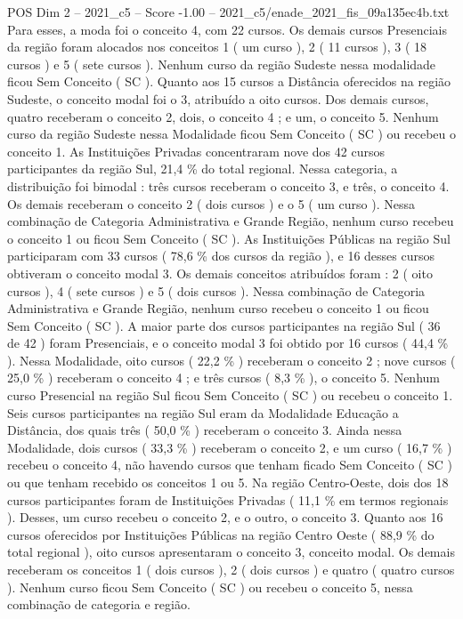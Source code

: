 \begin{textsample}{POS Dim 2 – 2021\_c5 – Score -1.00 – 2021\_c5/enade\_2021\_fis\_09a135ec4b.txt}
Para esses, a moda foi o conceito 4, com 22 cursos.
Os demais cursos Presenciais da região foram alocados nos conceitos 1 ( um curso ), 2 ( 11 cursos ), 3 ( 18 cursos ) e 5 ( sete cursos ).
Nenhum curso da região Sudeste nessa modalidade ficou Sem Conceito ( SC ).
Quanto aos 15 cursos a Distância oferecidos na região Sudeste, o conceito modal foi o 3, atribuído a oito cursos.
Dos demais cursos, quatro receberam o conceito 2, dois, o conceito 4 ; e um, o conceito 5.
Nenhum curso da região Sudeste nessa Modalidade ficou Sem Conceito ( SC ) ou recebeu o conceito 1.
As Instituições Privadas concentraram nove dos 42 cursos participantes da região Sul, 21,4 \% do total regional.
Nessa categoria, a distribuição foi bimodal : três cursos receberam o conceito 3, e três, o conceito 4.
Os demais receberam o conceito 2 ( dois cursos ) e o 5 ( um curso ).
Nessa combinação de Categoria Administrativa e Grande Região, nenhum curso recebeu o conceito 1 ou ficou Sem Conceito ( SC ).
As Instituições Públicas na região Sul participaram com 33 cursos ( 78,6 \% dos cursos da região ), e 16 desses cursos obtiveram o conceito modal 3.
Os demais conceitos atribuídos foram : 2 ( oito cursos ), 4 ( sete cursos ) e 5 ( dois cursos ).
Nessa combinação de Categoria Administrativa e Grande Região, nenhum curso recebeu o conceito 1 ou ficou Sem Conceito ( SC ).
A maior parte dos cursos participantes na região Sul ( 36 de 42 ) foram Presenciais, e o conceito modal 3 foi obtido por 16 cursos ( 44,4 \% ).
Nessa Modalidade, oito cursos ( 22,2 \% ) receberam o conceito 2 ; nove cursos ( 25,0 \% ) receberam o conceito 4 ; e três cursos ( 8,3 \% ), o conceito 5.
Nenhum curso Presencial na região Sul ficou Sem Conceito ( SC ) ou recebeu o conceito 1.
Seis cursos participantes na região Sul eram da Modalidade Educação a Distância, dos quais três ( 50,0 \% ) receberam o conceito 3.
Ainda nessa Modalidade, dois cursos ( 33,3 \% ) receberam o conceito 2, e um curso ( 16,7 \% ) recebeu o conceito 4, não havendo cursos que tenham ficado Sem Conceito ( SC ) ou que tenham recebido os conceitos 1 ou 5.
Na região Centro-Oeste, dois dos 18 cursos participantes foram de Instituições Privadas ( 11,1 \% em termos regionais ).
Desses, um curso recebeu o conceito 2, e o outro, o conceito 3.
Quanto aos 16 cursos oferecidos por Instituições Públicas na região Centro Oeste ( 88,9 \% do total regional ), oito cursos apresentaram o conceito 3, conceito modal.
Os demais receberam os conceitos 1 ( dois cursos ), 2 ( dois cursos ) e quatro ( quatro cursos ).
Nenhum curso ficou Sem Conceito ( SC ) ou recebeu o conceito 5, nessa combinação de categoria e região.

\end{textsample}
